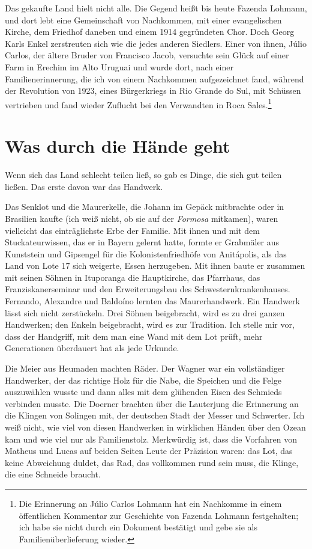 \documentclass[
  ngerman,
  11pt,
  openany]{book}
\begin{document}
Das gekaufte Land hielt nicht alle. Die Gegend heißt bis heute Fazenda
Lohmann, und dort lebt eine Gemeinschaft von Nachkommen, mit einer
evangelischen Kirche, dem Friedhof daneben und einem 1914 gegründeten
Chor. Doch Georg Karls Enkel zerstreuten sich wie die jedes anderen
Siedlers. Einer von ihnen, Júlio Carlos, der ältere Bruder von Francisco
Jacob, versuchte sein Glück auf einer Farm in Erechim im Alto Uruguai
und wurde dort, nach einer Familienerinnerung, die ich von einem
Nachkommen aufgezeichnet fand, während der Revolution von 1923, eines
Bürgerkriegs in Rio Grande do Sul, mit Schüssen vertrieben und fand
wieder Zuflucht bei den Verwandten in Roca Sales.\footnote{Die
  Erinnerung an Júlio Carlos Lohmann hat ein Nachkomme in einem
  öffentlichen Kommentar zur Geschichte von Fazenda Lohmann
  festgehalten; ich habe sie nicht durch ein Dokument bestätigt und gebe
  sie als Familienüberlieferung wieder.}

\section{Was durch die Hände geht}\label{was-durch-die-huxe4nde-geht}

Wenn sich das Land schlecht teilen ließ, so gab es Dinge, die sich gut
teilen ließen. Das erste davon war das Handwerk.

Das Senklot und die Maurerkelle, die Johann im Gepäck mitbrachte oder in
Brasilien kaufte (ich weiß nicht, ob sie auf der \emph{Formosa}
mitkamen), waren vielleicht das einträglichste Erbe der Familie. Mit
ihnen und mit dem Stuckateurwissen, das er in Bayern gelernt hatte,
formte er Grabmäler aus Kunststein und Gipsengel für die
Kolonistenfriedhöfe von Anitápolis, als das Land von Lote 17 sich
weigerte, Essen herzugeben. Mit ihnen baute er zusammen mit seinen
Söhnen in Ituporanga die Hauptkirche, das Pfarrhaus, das
Franziskanerseminar und den Erweiterungsbau des Schwesternkrankenhauses.
Fernando, Alexandre und Baldoíno lernten das Maurerhandwerk. Ein
Handwerk lässt sich nicht zerstückeln. Drei Söhnen beigebracht, wird es
zu drei ganzen Handwerken; den Enkeln beigebracht, wird es zur
Tradition. Ich stelle mir vor, dass der Handgriff, mit dem man eine Wand
mit dem Lot prüft, mehr Generationen überdauert hat als jede Urkunde.

Die Meier aus Heumaden machten Räder. Der Wagner war ein vollständiger
Handwerker, der das richtige Holz für die Nabe, die Speichen und die
Felge auszuwählen wusste und dann alles mit dem glühenden Eisen des
Schmieds verbinden musste. Die Doerner brachten über die Lauterjung die
Erinnerung an die Klingen von Solingen mit, der deutschen Stadt der
Messer und Schwerter. Ich weiß nicht, wie viel von diesen Handwerken in
wirklichen Händen über den Ozean kam und wie viel nur als Familienstolz.
Merkwürdig ist, dass die Vorfahren von Matheus und Lucas auf beiden
Seiten Leute der Präzision waren: das Lot, das keine Abweichung duldet,
das Rad, das vollkommen rund sein muss, die Klinge, die eine Schneide
braucht.
\end{document}

